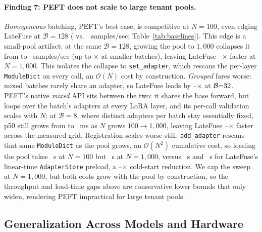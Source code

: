 \documentclass[11pt]{article}
\newcommand{\sysname}{LateFuse}
\begin{document}
\paragraph{Finding 7: PEFT does not scale to large tenant pools.}
\emph{Homogeneous} batching, PEFT's best case, is competitive at $N{=}100$, even
edging \sysname{} at $\mathcal{B}{=}128$
(\PeftHomogQpsNHundredBOneTwentyEight{}
vs.\ \SysRefQpsNHundredBOneTwentyEight~samples/sec;
Table~\ref{tab:baselines}). This edge is a small-pool
artifact: at the same $\mathcal{B}{=}128$, growing the pool to $1{,}000$
collapses it from \PeftHomogQpsNHundredBOneTwentyEight{} to
\PeftHomogQpsNOneKBOneTwentyEight~samples/sec (up to
\PeftHomogCollapseMax$\times$ at smaller batches), leaving \sysname{}
\SpeedupHomogNOneKBOneTwentyEight--\SpeedupHomogNOneKBEight$\times$ faster at
$N{=}1{,}000$. This isolates the collapse to \texttt{set\_adapter}, which rescans the per-layer
\texttt{ModuleDict} on every call, an $\mathcal{O}(N)$ cost by construction.
\emph{Grouped} fares worse: mixed
batches rarely share an adapter, so \sysname{} leads by
\SpeedupGroupedNHundredBThirtyTwo--\SpeedupGroupedNOneKBThirtyTwo$\times$ at
$\mathcal{B}{=}32$. PEFT's native \emph{mixed} API sits between
the two: it shares the base forward, but loops over the batch's adapters at
every LoRA layer, and its per-call validation scales with $N$: at
$\mathcal{B}{=}8$, where distinct adapters per batch stay essentially fixed,
p50 still grows from \PeftMixedPFiftyNHundredBEight{} to
\PeftMixedPFiftyNOneKBEight~ms as $N$ grows $100\to1{,}000$, leaving \sysname{}
\SpeedupMixedMin--\SpeedupMixedMax$\times$ faster across the measured grid.
Registration scales worse still: \texttt{add\_adapter} rescans that same
\texttt{ModuleDict} as the pool grows, an $\mathcal{O}(N^2)$ cumulative cost, so
loading the pool takes \PeftGroupedAddAdapterSecNHundred~s at $N{=}100$ but
\PeftGroupedAddAdapterSecNOneK~s at $N{=}1{,}000$, versus
\LateFuseColdLoadSecNHundred~s and \LateFuseColdLoadSecNOneK~s for \sysname{}'s
linear-time \texttt{AdapterStore} preload, a
\ColdStartSpeedupMin--\ColdStartSpeedupNOneK$\times$ cold-start reduction.
We cap the sweep at $N{=}1{,}000$, but both costs grow with the pool by
construction, so the throughput and load-time gaps above are conservative
lower bounds that only widen, rendering PEFT impractical for large tenant pools.


\subsection{Generalization Across Models and Hardware}
\label{sec:results_generalization}
\end{document}
